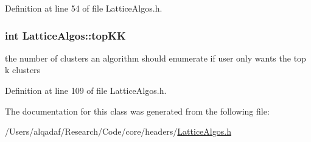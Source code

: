 Definition at line 54 of file LatticeAlgos.h.

\hypertarget{class_lattice_algos_a90e06533d513efc4635905624283eeae}{
\subsubsection[{topKK}]{\setlength{\rightskip}{0pt plus 5cm}int {\bf LatticeAlgos::topKK}}}
\label{class_lattice_algos_a90e06533d513efc4635905624283eeae}


the number of clusters an algorithm should enumerate if user only wants the top k clusters 



Definition at line 109 of file LatticeAlgos.h.



The documentation for this class was generated from the following file:\begin{DoxyCompactItemize}
\item 
/Users/alqadaf/Research/Code/core/headers/\hyperlink{_lattice_algos_8h}{LatticeAlgos.h}\end{DoxyCompactItemize}
